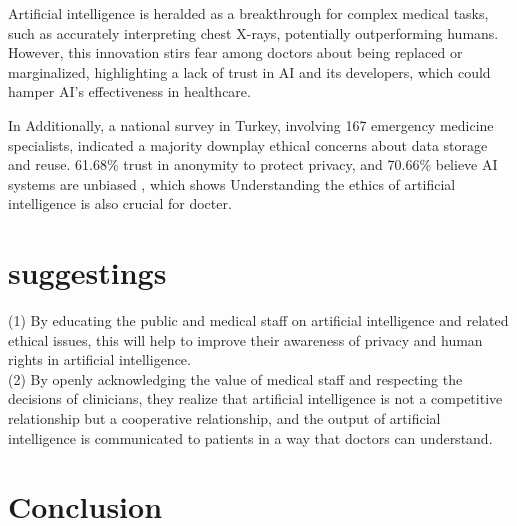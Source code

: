 \documentclass[paper=a4, fontsize=11pt]{scrartcl} %
\numberwithin{equation}{section} %
\numberwithin{figure}{section} %
\numberwithin{table}{section} %
\begin{document}

Artificial intelligence is heralded as a breakthrough for complex medical tasks, such as accurately interpreting chest X-rays, 
potentially outperforming humans. However, this innovation stirs fear among doctors about being replaced or marginalized, 
highlighting a lack of trust in AI and its developers, which could hamper AI's effectiveness in healthcare. 

In Additionally, a national survey in Turkey, involving 167 emergency medicine specialists, indicated a majority downplay ethical concerns about data storage 
and reuse. 61.68\% trust in anonymity to protect privacy, and 70.66\% believe AI systems are unbiased \cite{ahunPerceptionsConcernsEmergency2023}, 
which shows Understanding the ethics of artificial intelligence is also crucial for docter.



\section{suggestings}
(1) By educating the public and medical staff on artificial intelligence and related ethical issues, this will help 
to improve their awareness of privacy and human rights in artificial intelligence.
\\(2) By openly acknowledging the value of medical staff and respecting the decisions of clinicians, they realize that 
artificial intelligence is not a competitive relationship but a cooperative relationship, and the output of artificial 
intelligence is communicated to patients in a way that doctors can understand.

\section{Conclusion}
\end{document}
